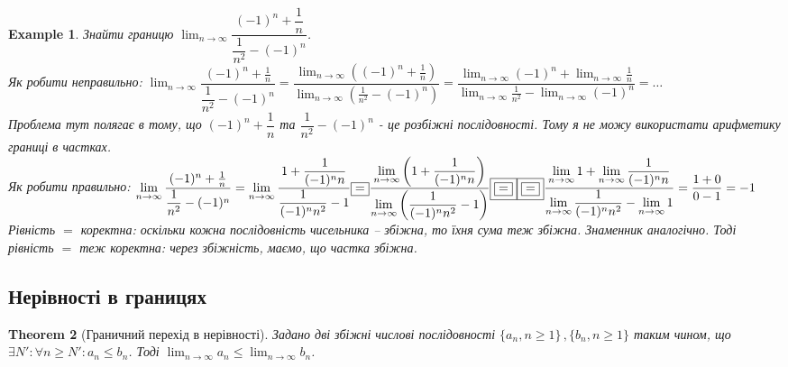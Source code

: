 \documentclass[a4paper, 14pt]{article}
\theoremstyle{theoremdd}
\newtheorem{theorem}{Theorem}[subsection]
\theoremstyle{theoremdd}
\theoremstyle{theoremdd}
\theoremstyle{theoremdd}
\newtheorem{example}[theorem]{Example}
\theoremstyle{theoremdd}
\theoremstyle{theoremdd}
\theoremstyle{theoremdd}
\theoremstyle{theoremdd}
\begin{document}
	\begin{example}
	Знайти границю $\displaystyle \lim_{n \to \infty} \dfrac{(-1)^n + \dfrac{1}{n}}{\dfrac{1}{n^2}- (-1)^n}$.\\
	Як робити неправильно: $\displaystyle \lim_{n \to \infty} \dfrac{(-1)^n + \frac{1}{n}}{\dfrac{1}{n^2}- (-1)^n} = \dfrac{\displaystyle \lim_{n \to \infty} \left( (-1)^n + \frac{1}{n} \right) }{\displaystyle \lim_{n \to \infty} \left( \frac{1}{n^2} - (-1)^n \right)} = \dfrac{\displaystyle \lim_{n \to \infty} (-1)^n + \lim_{n \to \infty} \frac{1}{n} }{\displaystyle \lim_{n \to \infty} \frac{1}{n^2} - \lim_{n \to \infty} (-1)^n} = \dots$\\
	Проблема тут полягає в тому, що $(-1)^n + \dfrac{1}{n}$ та $\dfrac{1}{n^2}-(-1)^n$ - це розбіжні послідовності. Тому я не можу використати арифметику границі в частках.\\
	Як робити правильно: $\displaystyle \lim_{n \to \infty} \dfrac{(-1)^n + \frac{1}{n}}{\dfrac{1}{n^2}- (-1)^n} = \lim_{n \to \infty} \dfrac{1 + \dfrac{1}{(-1)^n n}}{\dfrac{1}{(-1)^n n^2} - 1} \boxed{=} \dfrac{\displaystyle\lim_{n \to \infty} \left( 1 + \dfrac{1}{(-1)^n n} \right)}{\displaystyle\lim_{n \to \infty} \left( \dfrac{1}{(-1)^n n^2} - 1 \right)} \boxed{\boxed{=}}
	\\ \boxed{\boxed{=}} \dfrac{\displaystyle\lim_{n \to \infty} 1 + \lim_{n \to \infty} \dfrac{1}{(-1)^n n}}{\displaystyle\lim_{n \to \infty} \dfrac{1}{(-1)^n n^2} - \lim_{n \to \infty} 1 } = \dfrac{1+0}{0-1} = -1$\\
	Рівність $\boxed{\boxed{=}}$ коректна: оскільки кожна послідовність чисельника -- збіжна, то їхня сума теж збіжна. Знаменник аналогічно. Тоді рівність $\boxed{=}$ теж коректна: через збіжність, маємо, що частка збіжна.
	\end{example}
	
	\subsection{Нерівності в границях}
	\begin{theorem}[Граничний перехід в нерівності]
	Задано дві збіжні числові послідовності $\{a_n, n \geq 1\} \,, \{b_n, n \geq 1\}$ таким чином, що $\exists N': \forall n \geq N': a_n \leq b_n$. Тоді $\displaystyle \lim_{n \to \infty} a_n \leq \lim_{n \to \infty} b_n$.
	\end{theorem}
	
\end{document}
